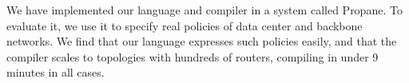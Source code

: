 \documentclass{sig-alternate-10pt}
\newcommand{\dpw}[1]{\textcolor{tmlblue}{[dpw: #1]}}
\newcommand{\sysname}{{\small \sf Propane}\xspace}
\begin{document}

We have implemented our language and compiler in a system called \sysname. To evaluate it, we use it to specify real policies of data center and backbone networks.
We find that our language expresses such policies easily, and that the compiler scales to topologies with hundreds of routers, compiling in under 9 minutes in all cases.

%

\end{document}
